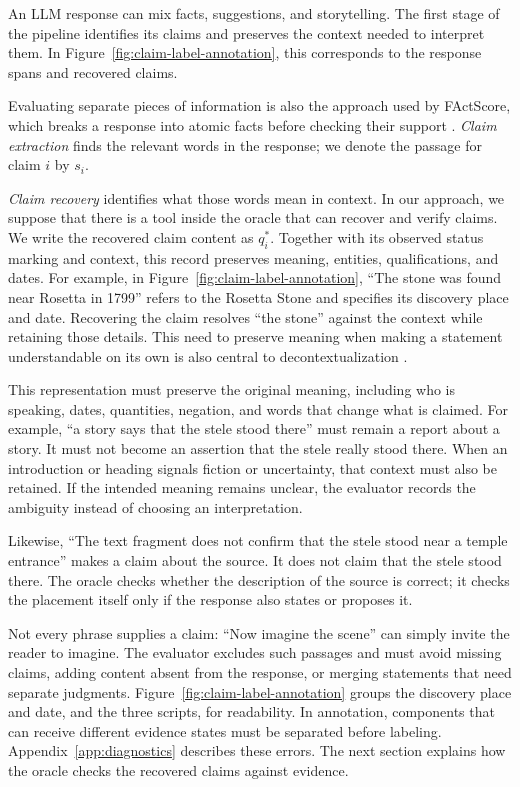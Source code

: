 \documentclass{clv2025}
\begin{document}
An LLM response can mix facts, suggestions, and storytelling. The first
stage of the pipeline identifies its claims and preserves the context
needed to interpret them. In Figure~\ref{fig:claim-label-annotation}, this
corresponds to the response spans and recovered claims.

Evaluating separate pieces of information is also the approach used by
FActScore, which breaks a response into atomic facts before checking their
support \citep{min_factscore_2023}. \emph{Claim extraction} finds the relevant
words in the response; we denote the passage for claim $i$ by $s_i$.

\emph{Claim recovery} identifies what those words mean in context. In our approach, we suppose that there is a tool inside the oracle that can recover and verify claims.  We write
the recovered claim content as $q_i^*$. Together with its observed status
marking and context, this record preserves meaning, entities, qualifications,
and dates. For example, in
Figure~\ref{fig:claim-label-annotation}, ``The stone was found near Rosetta
in 1799'' refers to the Rosetta Stone and specifies its discovery place and
date. Recovering the claim resolves ``the stone'' against the context while
retaining those details. This need to preserve meaning when making a
statement understandable on its own is also central to decontextualization
\citep{choi_decontextualization_2021}.

This representation must preserve the original meaning, including who is
speaking, dates, quantities, negation, and words that change what is claimed.
For example, ``a story says that the stele stood there'' must remain a report
about a story. It must not become an assertion that the stele really stood
there. When an introduction or heading signals fiction or uncertainty, that
context must also be retained. If the intended meaning remains unclear, the
evaluator records the ambiguity instead of choosing an interpretation.

Likewise, ``The text fragment does not confirm that the stele stood near a temple
entrance'' makes a claim about the source. It does not claim that the stele
stood there. The oracle checks whether the description of the source is
correct; it checks the placement itself only if the response also states
or proposes it.

Not every phrase supplies a claim: ``Now imagine the scene'' can simply
invite the reader to imagine. The evaluator excludes such passages and must
avoid missing claims, adding content absent from the response, or merging
statements that need separate judgments.
Figure~\ref{fig:claim-label-annotation} groups the discovery place and date,
and the three scripts, for readability. In annotation, components that can
receive different evidence states must be separated before labeling.
Appendix~\ref{app:diagnostics} describes these errors. The next section
explains how the oracle checks the recovered claims against evidence.
\end{document}

